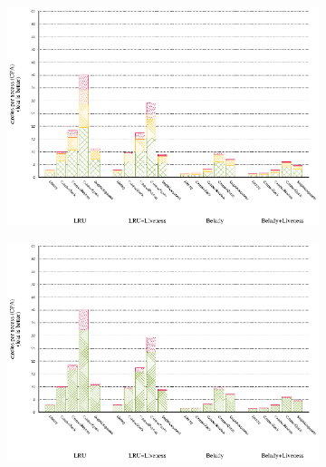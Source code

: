\documentclass[onecolumn, openright, master, english, signatures]{dbrgrptt}
\begin{document}
\begin{figure}[!ht]
  \begin{subfigure}[b]{0.5\textwidth}%
    \includegraphics[width=\textwidth]{figs/plots/perf-454-calculix.eps}
  \end{subfigure}%
    \begin{subfigure}[b]{0.5\textwidth}%
    \includegraphics[width=\textwidth]{figs/plots/perf-misses-454-calculix.eps}
  \end{subfigure}%
  \caption{}
  \label{fig:todo}
\end{figure}
\end{document}

